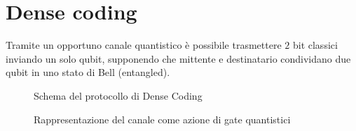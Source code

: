\documentclass[../../InformazioneQuantistica.tex]{subfiles}
\begin{document}
\section{Dense coding}
Tramite un opportuno canale quantistico è possibile trasmettere $2$ bit classici inviando un solo qubit, supponendo che mittente e destinatario condividano due qubit in uno stato di Bell (entangled).

\begin{figure}[H]
\centering

\caption{Schema del protocollo di Dense Coding\label{fig:dense-coding}}
\end{figure}

\begin{figure}[H]
\centering

\caption{Rappresentazione del canale come azione di gate quantistici\label{fig:dense-coding-gates}}
\end{figure}
\end{document}
